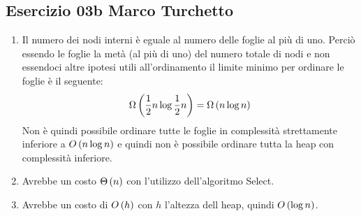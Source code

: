 
\subsection[03b MT]{Esercizio 03b Marco Turchetto}

\begin{enumerate}[label=\alph*)]
\item Il numero dei nodi interni è eguale al numero delle foglie al più di uno. Perciò essendo le foglie la metà (al più di uno) del numero totale di nodi e non essendoci altre ipotesi utili all'ordinamento il limite minimo per ordinare le foglie è il seguente:
	\begin{equation*}
		\Omega\left(\frac{1}{2}n \log{\frac{1}{2}n} \right) = \Omega\left(n \log n\right)
	\end{equation*}
	Non è quindi possibile ordinare tutte le foglie in complessità strettamente inferiore a $O\left(n \log n\right)$ e quindi non è possibile ordinare tutta la heap con complessità inferiore.
	
\item Avrebbe un costo $\Theta\left(n\right)$ con l'utilizzo dell'algoritmo Select.

\item Avrebbe un costo di $O\left(h\right)$ con $h$ l'altezza dell heap, quindi $O\left(\log n\right)$.
\end{enumerate}
